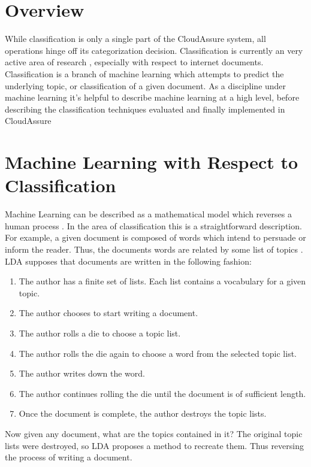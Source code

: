 \section{Overview}
While classification is only a single part of the CloudAssure system, all
operations hinge off its categorization decision. Classification is currently an
very active area of research \autocite{Zhang2000}, especially with respect to
internet documents. Classification is a branch of machine learning which
attempts to predict the underlying topic, or classification of a given document.
As a discipline under machine learning it's helpful to describe machine learning
at a high level, before describing the classification techniques evaluated and
finally implemented in CloudAssure

\section{Machine Learning with Respect to Classification}
Machine Learning can be described as a mathematical model which reverses a human
process \autocite{Bishop2009}. In the area of classification this is
a straightforward description. For example, a given document is composed of words which
intend to persuade or inform the reader. Thus, the documents words are related
by some list of topics \autocite{Blei2009}. \gls{LDA} supposes that documents are
written in the following fashion:
\begin{enumerate}
    \item The author has a finite set of lists. Each list contains a vocabulary
        for a given topic.
    \item The author chooses to start writing a document.
    \item The author rolls a die to choose a topic list.
    \item The author rolls the die again to choose a word from the selected
        topic list.
    \item The author writes down the word.
    \item The author continues rolling the die until the document is of sufficient
        length.
    \item Once the document is complete, the author destroys the topic lists.
\end{enumerate}
Now given any document, what are the topics contained in it? The original topic
lists were destroyed, so \gls{LDA} proposes a method to recreate them. Thus reversing
the process of writing a document.

